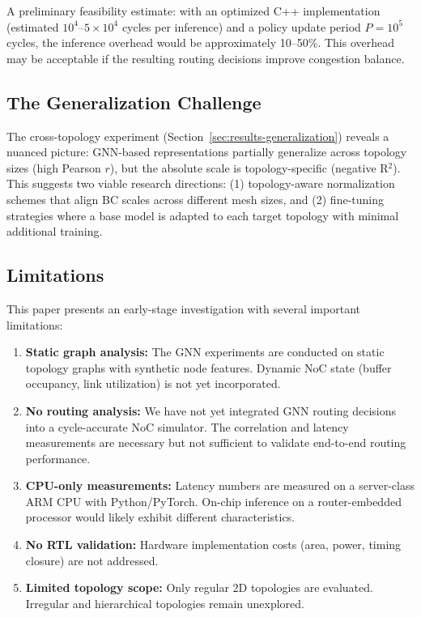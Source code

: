 \documentclass[conference]{IEEEtran}
\begin{document}
A preliminary feasibility estimate: with an optimized C++ implementation (estimated $10^4$--$5 \times 10^4$ cycles per inference) and a policy update period $P = 10^5$ cycles, the inference overhead would be approximately 10--50\%. This overhead may be acceptable if the resulting routing decisions improve congestion balance.

\subsection{The Generalization Challenge}

The cross-topology experiment (Section~\ref{sec:results-generalization}) reveals a nuanced picture: GNN-based representations partially generalize across topology sizes (high Pearson $r$), but the absolute scale is topology-specific (negative R$^2$). This suggests two viable research directions: (1) topology-aware normalization schemes that align BC scales across different mesh sizes, and (2) fine-tuning strategies where a base model is adapted to each target topology with minimal additional training.

\subsection{Limitations}
\label{sec:limitations}

This paper presents an early-stage investigation with several important limitations:
\begin{enumerate}
    \item \textbf{Static graph analysis:} The GNN experiments are conducted on static topology graphs with synthetic node features. Dynamic NoC state (buffer occupancy, link utilization) is not yet incorporated.
    \item \textbf{No routing analysis:} We have not yet integrated GNN routing decisions into a cycle-accurate NoC simulator. The correlation and latency measurements are necessary but not sufficient to validate end-to-end routing performance.
    \item \textbf{CPU-only measurements:} Latency numbers are measured on a server-class ARM CPU with Python/PyTorch. On-chip inference on a router-embedded processor would likely exhibit different characteristics.
    \item \textbf{No RTL validation:} Hardware implementation costs (area, power, timing closure) are not addressed.
    \item \textbf{Limited topology scope:} Only regular 2D topologies are evaluated. Irregular and hierarchical topologies remain unexplored.
\end{enumerate}
\end{document}
